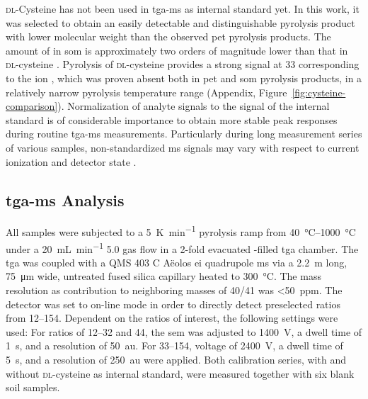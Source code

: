 \textsc{dl}-Cysteine has not been used in \ac{tga-ms} as internal standard yet. In this work, it was selected to obtain an easily detectable and distinguishable pyrolysis product with lower molecular weight than the observed \ac{pet} pyrolysis products. The amount of  in \ac{som} is approximately two orders of magnitude lower than that in \textsc{dl}-cysteine \citep{BlumeScheffer2016}. Pyrolysis of \textsc{dl}-cysteine provides a strong signal at \SI{33}{\mz} corresponding to the  ion \citep{ChoiDetermination1995}, which was proven absent both in \ac{pet} and \ac{som} pyrolysis products, in a relatively narrow pyrolysis temperature range (Appendix, Figure~\ref{fig:cysteine-comparison}).
Normalization of analyte signals to the signal of the internal standard is of considerable importance to obtain more stable peak responses during routine \ac{tga-ms} measurements. Particularly during long measurement series of various samples, non-standardized \ac{ms} signals may vary with respect to current ionization and detector state \citep{NetzschGeratebauMS2010}.

\subsection{\Acs{tga-ms} Analysis}\label{sec:tga-ms-analysis}

All samples were subjected to a \SI{5}{\kelvin\per\minute} pyrolysis ramp from \SIrange[range-phrase = { to }]{40}{1000}{\degreeCelsius} under a \SI{20}{\milli\liter\per\minute}  5.0 gas flow in a \num{2}-fold evacuated -filled \ac{tga} chamber. The \ac{tga} was coupled with a QMS 403 C Aëolos \ac{ei} quadrupole \ac{ms} via a \SI{2.2}{\meter} long, \SI{75}{\micro\meter} wide, untreated fused silica capillary heated to \SI{300}{\degreeCelsius}.
The mass resolution as contribution to neighboring masses of \num{40}/\num{41} was \SI{<50}{ppm}. The detector was set to on-line mode in order to directly detect preselected \si{\mz} ratios from \numrange[range-phrase = { to }]{12}{154}.
Dependent on the \si{\mz} ratios of interest, the following settings were used: For \si{\mz} ratios of \numrange{12}{32} and \num{44}, the \ac{sem} was adjusted to \SI{1400}{\volt}, a dwell time of \SI{1}{\second}, and a resolution of \SI{50}{au}. For \si{\mz} \numrange{33}{154},  voltage of \SI{2400}{\volt}, a dwell time of \SI{5}{\second}, and a resolution of \SI{250}{au} were applied.
Both calibration series, with and without \textsc{dl}-cysteine as internal standard, were measured together with six blank soil samples.

